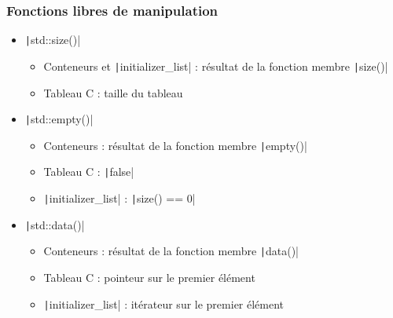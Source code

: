 \documentclass[C++.tex]{subfiles}
\begin{document}
\begin{frame}[fragile]
	\frametitle{Fonctions libres de manipulation}
	\begin{itemize}
		\item \texttt|std::size()|
		\begin{itemize}
			\item Conteneurs et \texttt|initializer_list| : résultat de la fonction membre \texttt|size()|
			\item Tableau C : taille du tableau
		\end{itemize} 

		\item \texttt|std::empty()|
		\begin{itemize}
			\item Conteneurs : résultat de la fonction membre \texttt|empty()|
			\item Tableau C : \texttt|false|
			\item \texttt|initializer_list| : \texttt|size() == 0|
		\end{itemize}

		\item \texttt|std::data()|
		\begin{itemize}
			\item Conteneurs : résultat de la fonction membre \texttt|data()|
			\item Tableau C : pointeur sur le premier élément
			\item \texttt|initializer_list| : itérateur sur le premier élément
		\end{itemize}
	\end{itemize}	
\end{frame}
\end{document}
